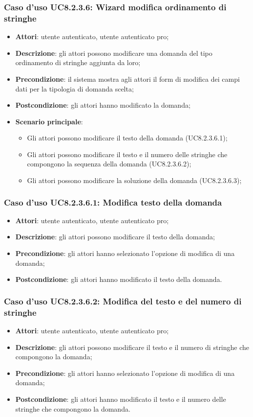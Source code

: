 \subsubsection{Caso d’uso UC8.2.3.6: Wizard modifica ordinamento di stringhe}
\begin{itemize}
	\item\textbf{Attori}: utente autenticato, utente autenticato pro;
	\item\textbf{Descrizione}: gli attori possono modificare una domanda del tipo ordinamento di stringhe aggiunta da loro;
	\item\textbf{Precondizione}: il sistema mostra agli attori il form di modifica dei campi dati per la tipologia di domanda scelta; 
	\item \textbf{Postcondizione}: gli attori hanno modificato la domanda;
	\item\textbf{Scenario principale}:
		\begin{itemize}
			\item Gli attori possono modificare il testo della domanda (UC8.2.3.6.1);
			\item Gli attori possono modificare il testo e il numero delle stringhe che compongono la sequenza della domanda (UC8.2.3.6.2);
			\item Gli attori possono modificare la soluzione della domanda (UC8.2.3.6.3); 
		\end{itemize}
\end{itemize}

\subsubsection{Caso d'uso UC8.2.3.6.1: Modifica testo della domanda}
\begin{itemize}
	\item \textbf{Attori}: utente autenticato, utente autenticato pro;
	\item \textbf{Descrizione}: gli attori possono modificare il testo della domanda;
	\item \textbf{Precondizione}: gli attori hanno selezionato l'opzione di modifica di una domanda;
	\item \textbf{Postcondizione}: gli attori hanno modificato il testo della domanda.
\end{itemize}

\subsubsection{Caso d'uso UC8.2.3.6.2: Modifica del testo e del numero di stringhe}
\begin{itemize}
	\item \textbf{Attori}: utente autenticato, utente autenticato pro;
	\item \textbf{Descrizione}: gli attori possono modificare il testo e il numero di stringhe che compongono la domanda;
	\item \textbf{Precondizione}: gli attori hanno selezionato l'opzione di modifica di una domanda;
	\item \textbf{Postcondizione}: gli attori hanno modificato il testo e il numero delle stringhe che compongono la domanda.
\end{itemize}

